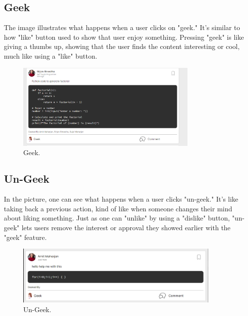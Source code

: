 \subsection{Geek}
The image illustrates what happens when a user clicks on "geek." It's similar to how "like" button used to show that user enjoy something. Pressing "geek" is like giving a thumbs up, showing that the user finds the content interesting or cool, much like using a "like" button.
\begin{figure}[H]
    \centering
    \includegraphics[width=0.8\textwidth]{Outcome-ss/geek.png}
    \caption{Geek.}
    \label{fig:Geek}
\end{figure}

\subsection{Un-Geek}
In the picture, one can see what happens when a user clicks "un-geek." It's like taking back a previous action, kind of like when someone changes their mind about liking something. Just as one can "unlike" by using a "dislike" button, "un-geek" lets users remove the interest or approval they showed earlier with the "geek" feature.
\begin{figure}[H]
    \centering
    \includegraphics[width=0.9\textwidth]{Outcome-ss/ungeek.png}
    \caption{Un-Geek.}
    \label{fig:Un-Geek}
\end{figure}

